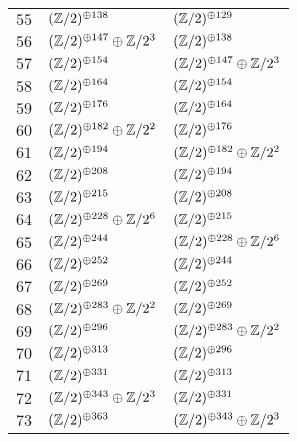 \begin{supertabular}{|c|p{5.5cm}|p{5.5cm}|}
$55$%
&$(\mathbb{Z}/2)^{\oplus138}$%
&$(\mathbb{Z}/2)^{\oplus129}$\\

$56$%
&$(\mathbb{Z}/2)^{\oplus147}\oplus\mathbb{Z}/2^{3}$%
&$(\mathbb{Z}/2)^{\oplus138}$\\

$57$%
&$(\mathbb{Z}/2)^{\oplus154}$%
&$(\mathbb{Z}/2)^{\oplus147}\oplus\mathbb{Z}/2^{3}$\\

$58$%
&$(\mathbb{Z}/2)^{\oplus164}$%
&$(\mathbb{Z}/2)^{\oplus154}$\\

$59$%
&$(\mathbb{Z}/2)^{\oplus176}$%
&$(\mathbb{Z}/2)^{\oplus164}$\\

$60$%
&$(\mathbb{Z}/2)^{\oplus182}\oplus\mathbb{Z}/2^{2}$%
&$(\mathbb{Z}/2)^{\oplus176}$\\

$61$%
&$(\mathbb{Z}/2)^{\oplus194}$%
&$(\mathbb{Z}/2)^{\oplus182}\oplus\mathbb{Z}/2^{2}$\\

$62$%
&$(\mathbb{Z}/2)^{\oplus208}$%
&$(\mathbb{Z}/2)^{\oplus194}$\\

$63$%
&$(\mathbb{Z}/2)^{\oplus215}$%
&$(\mathbb{Z}/2)^{\oplus208}$\\

$64$%
&$(\mathbb{Z}/2)^{\oplus228}\oplus\mathbb{Z}/2^{6}$%
&$(\mathbb{Z}/2)^{\oplus215}$\\

$65$%
&$(\mathbb{Z}/2)^{\oplus244}$%
&$(\mathbb{Z}/2)^{\oplus228}\oplus\mathbb{Z}/2^{6}$\\

$66$%
&$(\mathbb{Z}/2)^{\oplus252}$%
&$(\mathbb{Z}/2)^{\oplus244}$\\

$67$%
&$(\mathbb{Z}/2)^{\oplus269}$%
&$(\mathbb{Z}/2)^{\oplus252}$\\

$68$%
&$(\mathbb{Z}/2)^{\oplus283}\oplus\mathbb{Z}/2^{2}$%
&$(\mathbb{Z}/2)^{\oplus269}$\\

$69$%
&$(\mathbb{Z}/2)^{\oplus296}$%
&$(\mathbb{Z}/2)^{\oplus283}\oplus\mathbb{Z}/2^{2}$\\

$70$%
&$(\mathbb{Z}/2)^{\oplus313}$%
&$(\mathbb{Z}/2)^{\oplus296}$\\

$71$%
&$(\mathbb{Z}/2)^{\oplus331}$%
&$(\mathbb{Z}/2)^{\oplus313}$\\

$72$%
&$(\mathbb{Z}/2)^{\oplus343}\oplus\mathbb{Z}/2^{3}$%
&$(\mathbb{Z}/2)^{\oplus331}$\\

$73$%
&$(\mathbb{Z}/2)^{\oplus363}$%
&$(\mathbb{Z}/2)^{\oplus343}\oplus\mathbb{Z}/2^{3}$\\


\end{supertabular}
